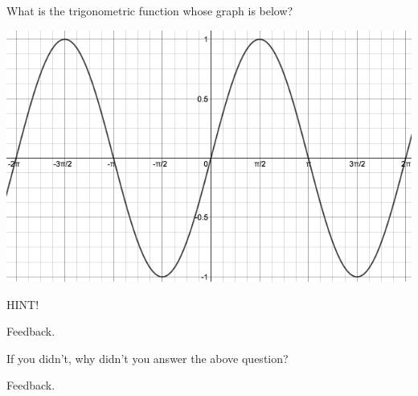 \documentclass{ximera}
\begin{document}
\begin{problem} 

\begin{problem}
    What is the trigonometric function whose graph is below?
    
    \begin{center} \includegraphics[scale=0.3]{TrigGraph.png} \end{center}
    
    \begin{hint}
    HINT!
    \end{hint}

  \begin{multipleChoice}
      
      \begin{feedback}[attempt]
          Feedback.
      \end{feedback}
      
  \end{multipleChoice}
  
\end{problem}

\begin{question}
  
    If you didn't, why didn't you answer the above question?
  
  \begin{multipleChoice}
      
      \begin{feedback}[attempt]
      Feedback.
      \end{feedback}
  \end{multipleChoice}
  
\end{question}

\end{problem}
\end{document}
